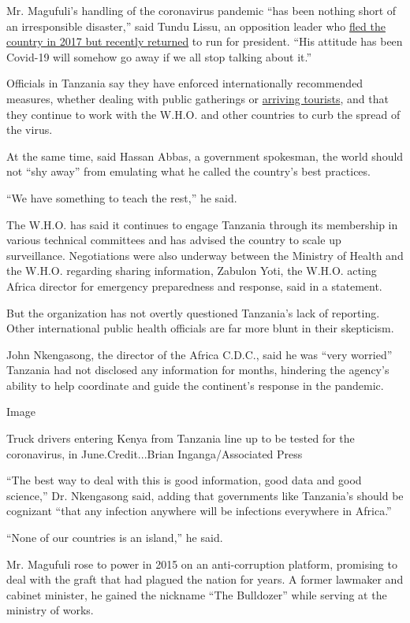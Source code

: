 Mr. Magufuli's handling of the coronavirus pandemic ``has been nothing
short of an irresponsible disaster,'' said Tundu Lissu, an opposition
leader who
\href{https://www.nytimes.com/aponline/2020/07/27/world/africa/ap-af-tanzania-opposition-leader-returns.html}{fled
the country in 2017 but recently returned} to run for president. ``His
attitude has been Covid-19 will somehow go away if we all stop talking
about it.''

Officials in Tanzania say they have enforced internationally recommended
measures, whether dealing with public gatherings or
\href{https://twitter.com/MsigwaGerson/status/1279145467297894403}{arriving
tourists}, and that they continue to work with the W.H.O. and other
countries to curb the spread of the virus.

At the same time, said Hassan Abbas, a government spokesman, the world
should not ``shy away'' from emulating what he called the country's best
practices.

``We have something to teach the rest,'' he said.

The W.H.O. has said it continues to engage Tanzania through its
membership in various technical committees and has advised the country
to scale up surveillance. Negotiations were also underway between the
Ministry of Health and the W.H.O. regarding sharing information, Zabulon
Yoti, the W.H.O. acting Africa director for emergency preparedness and
response, said in a statement.

But the organization has not overtly questioned Tanzania's lack of
reporting. Other international public health officials are far more
blunt in their skepticism.

John Nkengasong, the director of the Africa C.D.C., said he was ``very
worried'' Tanzania had not disclosed any information for months,
hindering the agency's ability to help coordinate and guide the
continent's response in the pandemic.

Image

Truck drivers entering Kenya from Tanzania line up to be tested for the
coronavirus, in June.Credit...Brian Inganga/Associated Press

``The best way to deal with this is good information, good data and good
science,'' Dr. Nkengasong said, adding that governments like Tanzania's
should be cognizant ``that any infection anywhere will be infections
everywhere in Africa.''

``None of our countries is an island,'' he said.

Mr. Magufuli rose to power in 2015 on an anti-corruption platform,
promising to deal with the graft that had plagued the nation for years.
A former lawmaker and cabinet minister, he gained the nickname ``The
Bulldozer'' while serving at the ministry of works.

